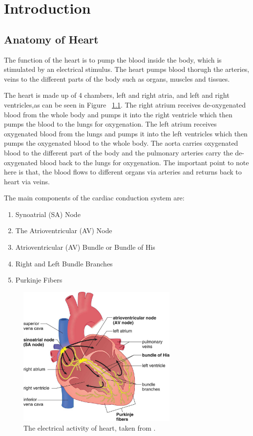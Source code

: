 \chapter{Introduction}


\section{Anatomy of Heart}
The function of the heart is to pump the blood inside the body, which is stimulated by an electrical stimulus. The heart pumps blood thorugh the arteries, veins to the different parts of the body such as organs, muscles and tissues.

The heart is made up of 4 chambers, left and right atria, and left and right ventricles,as can be seen in Figure ~\ref{fig:heart_anatomy}. The right atrium receives de-oxygenated blood from the whole body and pumps it into the right ventricle which then pumps the blood to the lungs for oxygenation. The left atrium receives oxygenated blood from the lungs and pumps it into the left ventricles which then pumps the oxygenated blood to the whole body. The aorta carries oxygenated blood to the different part of the body and the pulmonary arteries carry the de-oxygenated blood back to the lungs for oxygenation. The important point to note here is that, the blood flows to different organs via arteries and returns back to heart via veins.


The main components of the cardiac conduction system are:
\begin{enumerate}
	\item Synoatrial (SA) Node
	\item The Atrioventricular (AV) Node
	\item Atrioventricular (AV) Bundle or Bundle of His
	\item Right and Left Bundle Branches
	\item Purkinje Fibers
\end{enumerate}


\begin{figure}[htpb]
	\centering
	\includegraphics[width=\textwidth,height=7cm,keepaspectratio=true]{images/electric_activity_heart}
	\caption{
		The electrical activity of heart, taken from \cite{electric_activity_heart}.
	}
	\label{fig:heart_anatomy}
\end{figure}




